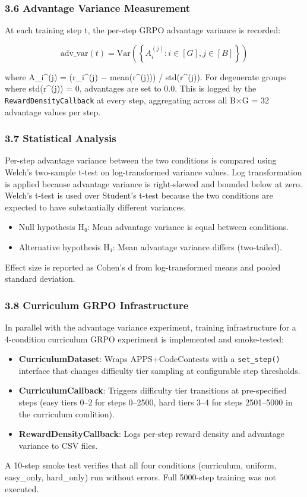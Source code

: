 \subsubsection{3.6 Advantage Variance Measurement}

At each training step t, the per-step GRPO advantage variance is recorded:

$$\text{adv\_var}(t) = \text{Var}\left(\left\{ A_i^{(j)} : i \in [G], j \in [B] \right\}\right)$$

where A_i^(j) = (r_i^(j) − mean(r^(j))) / std(r^(j)). For degenerate groups where std(r^(j)) = 0, advantages are set to 0.0. This is logged by the \texttt{RewardDensityCallback} at every step, aggregating across all B×G = 32 advantage values per step.

\subsubsection{3.7 Statistical Analysis}

Per-step advantage variance between the two conditions is compared using Welch's two-sample t-test on log-transformed variance values. Log transformation is applied because advantage variance is right-skewed and bounded below at zero. Welch's t-test is used over Student's t-test because the two conditions are expected to have substantially different variances.

\begin{itemize}
\item Null hypothesis H₀: Mean advantage variance is equal between conditions.
\item Alternative hypothesis H₁: Mean advantage variance differs (two-tailed).
\end{itemize}

Effect size is reported as Cohen's d from log-transformed means and pooled standard deviation.

\subsubsection{3.8 Curriculum GRPO Infrastructure}

In parallel with the advantage variance experiment, training infrastructure for a 4-condition curriculum GRPO experiment is implemented and smoke-tested:

\begin{itemize}
\item \textbf{CurriculumDataset}: Wraps APPS+CodeContests with a \texttt{set_step()} interface that changes difficulty tier sampling at configurable step thresholds.
\item \textbf{CurriculumCallback}: Triggers difficulty tier transitions at pre-specified steps (easy tiers 0–2 for steps 0–2500, hard tiers 3–4 for steps 2501–5000 in the curriculum condition).
\item \textbf{RewardDensityCallback}: Logs per-step reward density and advantage variance to CSV files.
\end{itemize}

A 10-step smoke test verifies that all four conditions (curriculum, uniform, easy_only, hard_only) run without errors. Full 5000-step training was not executed.
